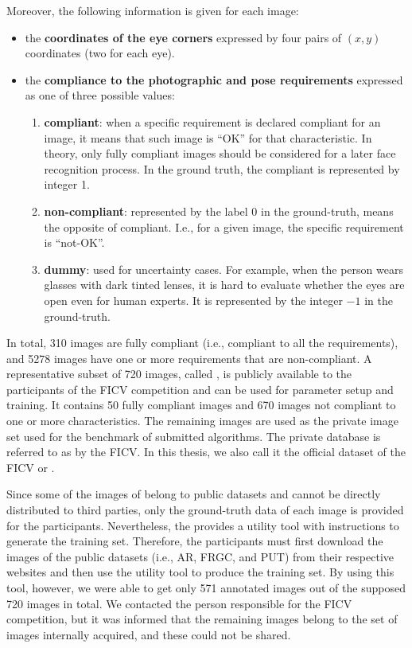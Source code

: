 Moreover, the following information is given for each image:

\begin{itemize}
\item the \textbf{coordinates of the eye corners} expressed by four pairs of $(x, y)$ coordinates (two for each eye).
\item the \textbf{compliance to the photographic and pose requirements} expressed as one of three possible values:     
    \begin{enumerate}[i]
    \item \textbf{compliant}: when a specific requirement is declared compliant for an image, it means that such image is ``OK'' for that characteristic. In theory, only fully compliant images should be considered for a later face recognition process. In the ground truth, the compliant is represented by integer 1.
    \item \textbf{non-compliant}: represented by the label 0 in the ground-truth, means the opposite of compliant. I.e., for a given image, the specific requirement is ``not-OK''.
    \item \textbf{dummy}: used for uncertainty cases. For example, when the person wears glasses with dark tinted lenses, it is hard to evaluate whether the eyes are open even for human experts. It is represented by the integer $-1$ in the ground-truth.
    \end{enumerate}
\end{itemize}

In total, 310 images are fully compliant (i.e., compliant to all the requirements), and 5278 images have one or more requirements that are non-compliant. A representative subset of 720 images, called \ficvtest, is publicly available to the participants of the FICV competition and can be used for parameter setup and training. It contains 50 fully compliant images and 670 images not compliant to one or more characteristics. The remaining images are used as the private image set used for the benchmark of submitted algorithms. The private database is referred to as \ficvofficial by the FICV. In this thesis, we also call it the official dataset of the FICV or \fvcongoing. 

Since some of the images of \ficvtest belong to public datasets and cannot be directly distributed to third parties, only the ground-truth data of each image is provided for the participants. Nevertheless, the \fvcongoing provides a utility tool with instructions to generate the training set. Therefore, the participants must first download the images of the public datasets (i.e., AR, FRGC, and PUT) from their respective websites and then use the utility tool to produce the training set. By using this tool, however, we were able to get only 571 annotated images out of the supposed 720 images in total. We contacted the person responsible for the FICV competition, but it was informed that the remaining images belong to the set of images internally acquired, and these could not be shared.

